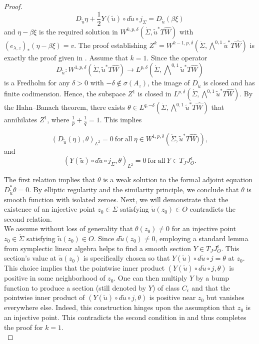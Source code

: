 \documentclass[11pt, a4paper]{amsart}
\begin{document}
\begin{proof}
$$D_{\tilde{u}}\eta+\frac{1}{2}Y(\tilde{u})\circ d\tilde{u}\circ j_{\Sigma}=D_{\tilde{u}}(\beta \xi)$$
and $\eta-\beta \xi$ is the required solution in $W^{k,p,\delta}\left(\dot{\Sigma}, \tilde{u}^*T\widehat{W}\right)$ with $(e_{\lambda,z})_*(\eta-\beta\xi)=v$. The proof establishing $Z^k = W^{k-1,p,\delta}\left(\dot{\Sigma}, \bigwedge\nolimits^{0,1}\tilde{u}^*T\widehat{W}\right)$ is exactly the proof given in \cite[Section~8.3]{SFTwendl}. Assume that $k = 1$. Since the operator
$$D_{\tilde{u}} \colon W^{1,p,\delta}\left(\dot{\Sigma},\tilde{u}^*T\widehat{W}\right) \rightarrow L^{p,\delta}\left(\dot{\Sigma}, \bigwedge\nolimits^{0,1}\tilde{u}^*T\widehat{W}\right)$$
is a Fredholm for any $\delta>0$ with $-\delta \not\in \sigma(A_z)$, the image of $D_{\tilde{u}}$ is closed and has finite codimension. Hence, the subspace $Z^1$ is closed in $L^{p,\delta} \left(\dot{\Sigma}, \bigwedge\nolimits^{0,1} \tilde{u}^*T\widehat{W}\right)$. By the Hahn--Banach theorem, there exists $\theta \in L^{q,-\delta} \left(\dot{\Sigma}, \bigwedge\nolimits^{0,1} \tilde{u}^*T\widehat{W}\right)$ that annihilates $Z^1$, where $\frac{1}{p} + \frac{1}{q} = 1$. This implies 

$$\left(D_{\tilde{u}}(\eta), \theta\right)_{L^{2}} = 0 \mathrm{\ for\ all\ } \eta \in W^{1,p,\delta} \left(\dot{\Sigma},\tilde{u} ^* T \widehat{W})\right),$$
and 
$$\left(Y(\tilde{u}) \circ d\tilde{u} \circ j_{\Sigma} , \theta \right)_{L^2} = 0 \mathrm{\ for\ all\ } Y \in T_J J^{\epsilon}_O.$$


The first relation implies that $\theta$ is a weak solution to the formal adjoint equation $D^*_{\tilde{u}} \theta = 0$. By elliptic regularity and the similarity principle, we conclude that $\theta$ is smooth function with isolated zeroes. Next, we will demonstrate that the existence of an injective point $z_0 \in \dot{\Sigma}$ satisfying $\tilde{u} (z_0) \in O$ contradicts the second relation.\\

We assume without loss of generality that $\theta(z_0)\neq 0$ for an injective point $z_0 \in \dot{\Sigma}$ satisfying $\tilde{u} (z_0) \in O$. Since $d\tilde{u} (z_0) \neq 0$, employing a standard lemma from symplectic linear algebra \cite[Lemma~3.2.2]{mcduff2012j} helps to find a smooth section $Y \in T_{J} J^{\epsilon}_O$. This section’s value at $\tilde{u}(z_0)$ is specifically chosen so that $Y(\tilde{u}) \circ d\tilde{u} \circ j= \theta$ at $z_0$.
This choice implies that the pointwise inner product $\left(Y(\tilde{u}) \circ d\tilde{u} \circ j, \theta\right)$ is positive in some neighborhood of $z_0$. One can then multiply $Y$ by a bump function to produce a section (still denoted by $Y$) of class $C_{\epsilon}$ and that the pointwise inner product of $\left(Y(\tilde{u}) \circ d\tilde{u} \circ j, \theta \right)$ is positive near $z_0$ but vanishes everywhere else. Indeed, this construction hinges upon the assumption that $z_0$ is an injective point. This contradicts the second condition in and thus completes the proof for $k= 1$.\\


\end{proof}
\end{document}
